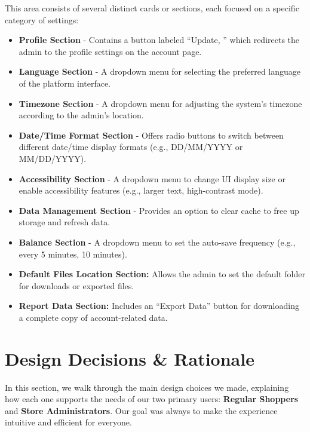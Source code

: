 \documentclass[11pt,a4paper]{article}
\begin{document}
	This area consists of several distinct cards or sections, each focused on a specific category of settings:
	\begin{itemize}
		\item \textbf{Profile Section} - Contains a button labeled ``Update, '' which redirects the admin to the profile settings on the account page.
		\item \textbf{Language Section} - A dropdown menu for selecting the preferred language of the platform interface.
		\item \textbf{Timezone Section} - A dropdown menu for adjusting the system's timezone according to the admin’s location.
		\item \textbf{Date/Time Format Section} - Offers radio buttons to switch between different date/time display formats (e.g., DD/MM/YYYY or MM/DD/YYYY).
		\item \textbf{Accessibility Section} - A dropdown menu to change UI display size or enable accessibility features (e.g., larger text, high-contrast mode).
		\item \textbf{Data Management Section} - Provides an option to clear cache to free up storage and refresh data.
		\item \textbf{Balance Section} - A dropdown menu to set the auto-save frequency (e.g., every 5 minutes, 10 minutes).
		\item \textbf{Default Files Location Section:} Allows the admin to set the default folder for downloads or exported files.
		\item \textbf{Report Data Section:} Includes an ``Export Data'' button for downloading a complete copy of account-related data.
	\end{itemize}
	
	
	
\section{Design Decisions \& Rationale}

In this section, we walk through the main design choices we made, explaining how each one supports the needs of our two primary users: \textbf{Regular Shoppers} and \textbf{Store Administrators}. Our goal was always to make the experience intuitive and efficient for everyone.
\end{document}

